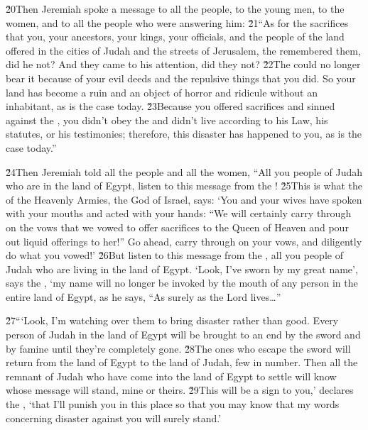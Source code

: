\v{20}Then Jeremiah spoke a message to all the people, to the young men, to the women, and to all the people who were answering him: \v{21}``As for the sacrifices that you, your ancestors, your kings, your officials, and the people of the land offered in the cities of Judah and the streets of Jerusalem, the  remembered them, did he not? And they came to his attention, did they not? \v{22}The  could no longer bear it because of your evil deeds and the repulsive things that you did. So your land has become a ruin and an object of horror and ridicule without an inhabitant, as is the case today. \v{23}Because you offered sacrifices and sinned against the , you didn't obey the  and didn't live according to his Law, his statutes, or his testimonies; therefore, this disaster has happened to you, as is the case today.''

\v{24}Then Jeremiah told all the people and all the women, ``All you people of Judah who are in the land of Egypt, listen to this message from the ! \v{25}This is what the  of the Heavenly Armies, the God of Israel, says: `You and your wives have spoken with your mouths and acted with your hands: ``We will certainly carry through on the vows that we vowed to offer sacrifices to the Queen of Heaven and pour out liquid offerings to her!'' Go ahead, carry through on your vows, and diligently do what you vowed!' \v{26}But listen to this message from the , all you people of Judah who are living in the land of Egypt. `Look, I've sworn by my great name', says the , `my name will no longer be invoked by the mouth of any person in the entire land of Egypt, as he says, ``As surely as the Lord  lives{\ldots}''

\v{27}```Look, I'm watching over them to bring disaster rather than good. Every person of Judah in the land of Egypt will be brought to an end by the sword and by famine until they're completely gone. \v{28}The ones who escape the sword will return from the land of Egypt to the land of Judah, few in number. Then all the remnant of Judah who have come into the land of Egypt to settle will know whose message will stand, mine or theirs. \v{29}This will be a sign to you,' declares the , `that I'll punish you in this place so that you may know that my words concerning disaster against you will surely stand.'

